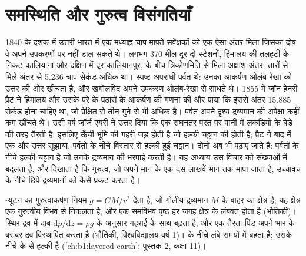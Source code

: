 \chapter{समस्थिति और गुरुत्व विसंगतियाँ}\label{ch:b1:isostasy-gravity}

1840 के दशक में उत्तरी भारत में एक मध्याह्न-चाप मापते सर्वेक्षकों को एक ऐसा अंतर मिला जिसका दोष वे अपने उपकरणों पर नहीं डाल सकते थे। लगभग 370 मील दूर दो स्टेशनों, हिमालय की तलहटी के निकट कालियाना और दक्षिण में दूर कालियानपुर, के बीच त्रिकोणमिति से मिला अक्षांश-अंतर, तारों से मिले अंतर से 5.236 चाप-सेकंड अधिक था। स्पष्ट अपराधी पर्वत थे: उनका आकर्षण ओलंब-रेखा को उत्तर की ओर खींचता है, और खगोलविद अपने उपकरण ओलंब-रेखा से साधते थे। 1855 में जॉन हेनरी प्रैट ने हिमालय और उसके परे के पठारों के आकर्षण की गणना की और पाया कि इससे अंतर 15.885 सेकंड होना चाहिए था, जो प्रेक्षित से तीन गुने से भी अधिक है। पर्वत अपने दृश्य द्रव्यमान की अपेक्षा कहीं कम खींचते थे। उसी वर्ष जॉर्ज एयरी ने उत्तर दिया कि  एक सघनतर परत पर पानी में लकड़ियों के बेड़े की तरह तैरती है, इसलिए ऊँची भूमि की गहरी जड़ होती है जो हल्की चट्टान की होती है; प्रैट ने बाद में एक और उत्तर सुझाया, पर्वतों के नीचे विस्तार से हल्की हुई चट्टान। दोनों अब भी पढ़ाए जाते हैं: पर्वतों के नीचे हल्की चट्टान है जो उनके द्रव्यमान की भरपाई करती है। यह अध्याय उस विचार को संख्याओं में बदलता है, और दिखाता है कि गुरुत्व, जो अपने मान के एक दस-लाखवें भाग तक मापा जाता है, उच्चावच के नीचे छिपे द्रव्यमानों को कैसे प्रकट करता है।

\begin{recall}
न्यूटन का गुरुत्वाकर्षण नियम $g = GM/r^2$ देता है, जो गोलीय द्रव्यमान $M$ के बाहर का क्षेत्र है; यह क्षेत्र एक गुरुत्वीय विभव से निकलता है, और एक समविभव पृष्ठ हर जगह क्षेत्र के लंबवत होता है (भौतिकी)। स्थिर द्रव में दाब $\mathrm dp/\mathrm dz = \rho g$ के अनुसार गहराई के साथ बढ़ता है, और एक तैरता पिंड अपने भार के बराबर द्रव विस्थापित करता है (भौतिकी, विश्वविद्यालय वर्ष 1)।  के नीचे  लंबे समयों में बहता है;  उसके नीचे के  से हल्की है (\cref{ch:b1:layered-earth}; पुस्तक 2, कक्षा 11)।
\end{recall}

